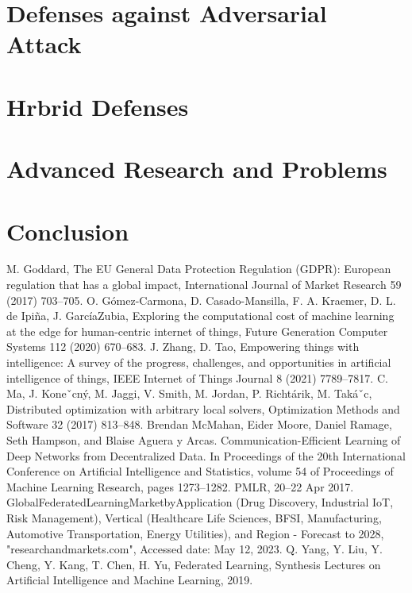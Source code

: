 \documentclass[conference]{IEEEtran}
\begin{document}
\section{Defenses against Adversarial Attack}
\section{Hrbrid Defenses}
\section{Advanced Research and Problems}
\section{Conclusion}




\begin{thebibliography}{00}
     M. Goddard, The EU General Data Protection Regulation (GDPR): European regulation that has a global impact, International Journal of Market Research 59 (2017) 703–705.
     O. Gómez-Carmona, D. Casado-Mansilla, F. A. Kraemer, D. L. de Ipiña, J. GarcíaZubia, Exploring the computational cost of machine learning at the edge for human-centric internet of things, Future Generation Computer Systems 112 (2020) 670–683.
     J. Zhang, D. Tao, Empowering things with intelligence: A survey of the progress, challenges, and opportunities in artificial intelligence of things, IEEE Internet of Things Journal 8 (2021) 7789–7817.
     C. Ma, J. Koneˇcný, M. Jaggi, V. Smith, M. Jordan, P. Richtárik, M. Takáˇc, Distributed optimization with arbitrary local solvers, Optimization Methods and Software 32 (2017) 813–848.
     Brendan McMahan, Eider Moore, Daniel Ramage, Seth Hampson, and Blaise Aguera y Arcas. Communication-Efficient Learning of Deep Networks from Decentralized Data. In Proceedings of the 20th International Conference on Artificial Intelligence and Statistics, volume 54 of Proceedings of Machine Learning Research, pages 1273–1282. PMLR, 20–22 Apr 2017.
     GlobalFederatedLearningMarketbyApplication (Drug Discovery, Industrial IoT, Risk Management), Vertical (Healthcare  Life Sciences, BFSI, Manufacturing, Automotive Transportation, Energy  Utilities), and Region - Forecast to 2028, "researchandmarkets.com", Accessed date: May 12, 2023.
     Q. Yang, Y. Liu, Y. Cheng, Y. Kang, T. Chen, H. Yu, Federated Learning, Synthesis Lectures on Artificial Intelligence and Machine Learning, 2019.

\end{thebibliography}
\end{document}
